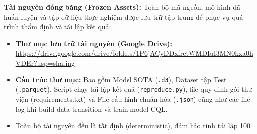 \textbf{Tài nguyên đóng băng (Frozen Assets):}
Toàn bộ mã nguồn, mô hình đã huấn luyện và tập dữ liệu thực nghiệm được lưu trữ tập trung để phục vụ quá trình thẩm định và tái lập kết quả:
\begin{itemize}
    \item \textbf{Thư mục lưu trữ tài nguyên (Google Drive):} \url{https://drive.google.com/drive/folders/1P6jACyDDxfretWMDIuI3MN0kxa0hVDEr?usp=sharing}
    \item \textbf{Cấu trúc thư mục:} Bao gồm Model SOTA (\texttt{.d3}), Dataset tập Test (\texttt{.parquet}), Script chạy tái lập kết quả (\texttt{reproduce.py}), file quy định gói thư viện (requirements.txt) và File cấu hình chuẩn hóa (\texttt{.json}) cũng như các file log khi build data transition và train model CQL.
    \item Toàn bộ tài nguyên đều là tất định (deterministic), đảm bảo tính tái lập 100%
\end{itemize}
